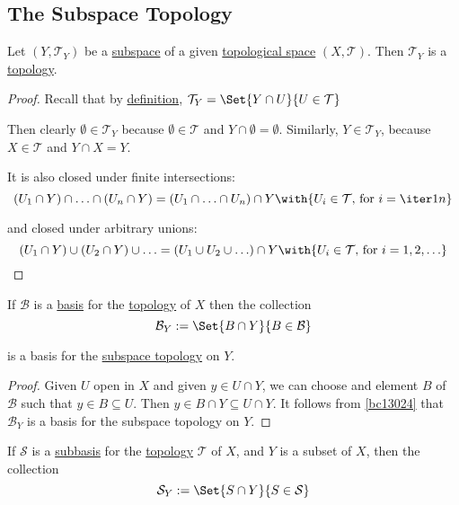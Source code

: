 \subsection{The Subspace Topology}\label{c73c655}

\label{b9e513c}

Let $(Y,\mathcal T_Y)$ be a \href{cddfbd8}{subspace} of a given
\href{de3c1b1}{topological space} $(X,\mathcal T)$. Then $\mathcal T_Y$ is a
\href{cc8eb8b}{topology}.

\begin{proof}
  \def\T{\mathcal T}
  Recall that by \href{cddfbd8}{definition}, $\T_Y=\Set{Y\cap U}{U\in\T}$

  Then clearly $\emptyset\in\T_Y$ because $\emptyset\in\T$ and
  $Y\cap\emptyset=\emptyset$. Similarly, $Y\in\T_Y$, because $X\in\T$ and
  $Y\cap X=Y$.

  It is also closed under finite intersections:
  $$
    (U_1\cap Y)\cap\ldots\cap(U_n\cap Y)=(U_1\cap\ldots\cap U_n)\cap Y
    \with{U_i\in\T\text{, for }i=\iter1n}
  $$

  and closed under arbitrary unions:
  $$
    (U_1\cap Y)\cup(U_2\cap Y)\cup\ldots=(U_1\cup U_2\cup\ldots)\cap Y
    \with{U_i\in\T\text{, for }i=1,2,\ldots}
  $$
\end{proof}

\label{a4e8ce7}

If $\mathcal B$ is a \href{e896402}{basis} for the \href{cc8eb8b}{topology} of
$X$ then the collection
$$
  \mathcal B_Y:=\Set{B\cap Y}{B\in\mathcal B}
$$

is a basis for the \href{cddfbd8}{subspace topology} on $Y$.

\begin{proof}
  Given $U$ open in $X$ and given $y\in U\cap Y$, we can choose and element $B$
  of $\mathcal B$ such that $y\in B\subseteq U$. Then $y\in B\cap Y\subseteq
  U\cap Y$. It follows from \autoref{bc13024} that $\mathcal B_Y$ is a basis for the
  subspace topology on $Y$.
\end{proof}

\label{da3a0b1}

If $\mathcal S$ is a \href{aba7b48}{subbasis} for the \href{cc8eb8b}{topology}
$\mathcal T$ of $X$, and $Y$ is a subset of $X$, then the collection
$$
  \mathcal S_Y:=\Set{S\cap Y}{S\in\mathcal S}
$$

